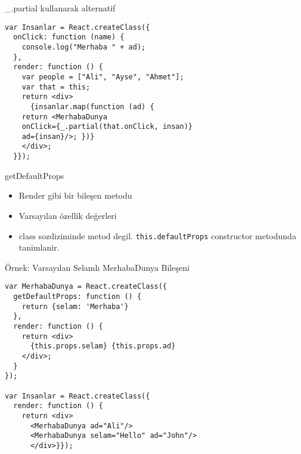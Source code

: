 \documentclass[presentation]{beamer}
\begin{document}
\begin{frame}[fragile,label={sec:org7d6b298}]{\_.partial kullanarak alternatif}
 \begin{verbatim}
var Insanlar = React.createClass({
  onClick: function (name) {
    console.log("Merhaba " + ad);
  },
  render: function () {
    var people = ["Ali", "Ayse", "Ahmet"];
    var that = this;
    return <div>
      {insanlar.map(function (ad) {
	return <MerhabaDunya
	onClick={_.partial(that.onClick, insan)}
	ad={insan}/>; })}
    </div>;
  }});
\end{verbatim}
\end{frame}

\begin{frame}[fragile,label={sec:org0d9d292}]{getDefaultProps}
 \begin{itemize}
\item Render gibi bir bileşen metodu
\item Varsayılan özellik değerleri
\item class sozdiziminde metod degil. \texttt{this.defaultProps} constructor metodunda tanimlanir.
\end{itemize}
\end{frame}


\begin{frame}[fragile,label={sec:orgc8b3f30}]{Örnek: Varsayılan Selamlı MerhabaDunya Bileşeni}
 \begin{verbatim}
var MerhabaDunya = React.createClass({
  getDefaultProps: function () {
    return {selam: 'Merhaba'}
  },
  render: function () {
    return <div>
      {this.props.selam} {this.props.ad}
    </div>;
  }
});

var Insanlar = React.createClass({
  render: function () {
    return <div>
      <MerhabaDunya ad="Ali"/>
      <MerhabaDunya selam="Hello" ad="John"/>
      </div>}});
\end{verbatim}
\end{frame}
\end{document}
